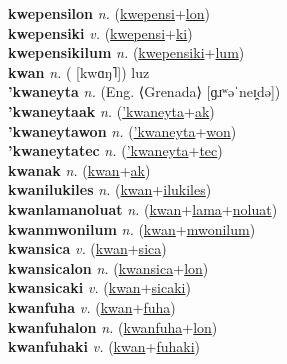\textbf{kwepensilon} \textit{n.} (\hyperref[kwepensi]{kwepensi}+\hyperref[lon]{lon})
 \label{kwepensilon} \\
\textbf{kwepensiki} \textit{v.} (\hyperref[kwepensi]{kwepensi}+\hyperref[ki]{ki})
 \label{kwepensiki} \\
\textbf{kwepensikilum} \textit{n.} (\hyperref[kwepensiki]{kwepensiki}+\hyperref[lum]{lum})
 \label{kwepensikilum} \\
\textbf{kwan} \textit{n.} ( [kwɑŋ˥])
luz \label{kwan} \\
\textbf{'kwaneyta} \textit{n.} (Eng. ⟨Grenada⟩ [ɡɹʷəˈneɪ̯də])
 \label{'kwaneyta} \\
\textbf{'kwaneytaak} \textit{n.} (\hyperref['kwaneyta]{'kwaneyta}+\hyperref[ak]{ak})
 \label{'kwaneytaak} \\
\textbf{'kwaneytawon} \textit{n.} (\hyperref['kwaneyta]{'kwaneyta}+\hyperref[won]{won})
 \label{'kwaneytawon} \\
\textbf{'kwaneytatec} \textit{n.} (\hyperref['kwaneyta]{'kwaneyta}+\hyperref[tec]{tec})
 \label{'kwaneytatec} \\
\textbf{kwanak} \textit{n.} (\hyperref[kwan]{kwan}+\hyperref[ak]{ak})
 \label{kwanak} \\
\textbf{kwanilukiles} \textit{n.} (\hyperref[kwan]{kwan}+\hyperref[ilukiles]{ilukiles})
 \label{kwanilukiles} \\
\textbf{kwanlamanoluat} \textit{n.} (\hyperref[kwan]{kwan}+\hyperref[lama]{lama}+\hyperref[noluat]{noluat})
 \label{kwanlamanoluat} \\
\textbf{kwanmwonilum} \textit{n.} (\hyperref[kwan]{kwan}+\hyperref[mwonilum]{mwonilum})
 \label{kwanmwonilum} \\
\textbf{kwansica} \textit{v.} (\hyperref[kwan]{kwan}+\hyperref[sica]{sica})
 \label{kwansica} \\
\textbf{kwansicalon} \textit{n.} (\hyperref[kwansica]{kwansica}+\hyperref[lon]{lon})
 \label{kwansicalon} \\
\textbf{kwansicaki} \textit{v.} (\hyperref[kwan]{kwan}+\hyperref[sicaki]{sicaki})
 \label{kwansicaki} \\
\textbf{kwanfuha} \textit{v.} (\hyperref[kwan]{kwan}+\hyperref[fuha]{fuha})
 \label{kwanfuha} \\
\textbf{kwanfuhalon} \textit{n.} (\hyperref[kwanfuha]{kwanfuha}+\hyperref[lon]{lon})
 \label{kwanfuhalon} \\
\textbf{kwanfuhaki} \textit{v.} (\hyperref[kwan]{kwan}+\hyperref[fuhaki]{fuhaki})
 \label{kwanfuhaki} \\
